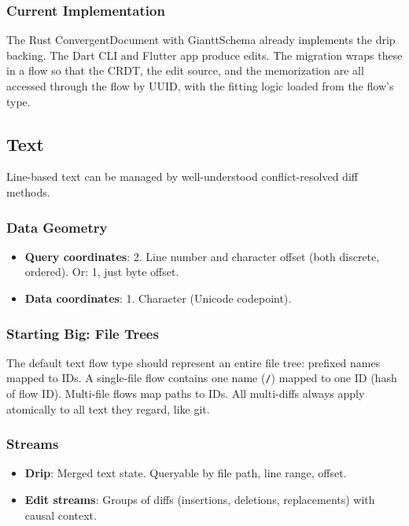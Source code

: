 \documentclass[11pt, letterpaper]{article}
\begin{document}
\subsubsection{Current Implementation}

The Rust ConvergentDocument with GianttSchema already implements the drip backing.
The Dart CLI and Flutter app produce edits. The migration wraps these in a flow so
that the CRDT, the edit source, and the memorization are all accessed through the flow
by UUID, with the fitting logic loaded from the flow's type.

\subsection{Text}
\label{sec:ex-text}

Line-based text can be managed by well-understood conflict-resolved diff methods.

\subsubsection{Data Geometry}
\begin{itemize}[leftmargin=2em]
  \item \textbf{Query coordinates}: 2. Line number and character offset (both discrete,
    ordered). Or: 1, just byte offset.
  \item \textbf{Data coordinates}: 1. Character (Unicode codepoint).
\end{itemize}

\subsubsection{Starting Big: File Trees}

The default text flow type should represent an entire file tree: prefixed names mapped
to IDs. A single-file flow contains one name (\texttt{/}) mapped to one ID (hash of
flow ID). Multi-file flows map paths to IDs. All multi-diffs always apply atomically
to all text they regard, like git.

\subsubsection{Streams}
\begin{itemize}[leftmargin=2em]
  \item \textbf{Drip}: Merged text state. Queryable by file path, line range, offset.
  \item \textbf{Edit streams}: Groups of diffs (insertions, deletions, replacements)
    with causal context.
\end{itemize}
\end{document}
